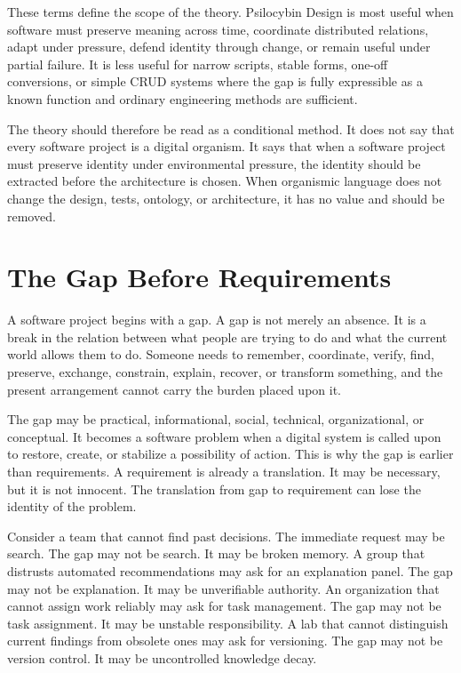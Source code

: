 \documentclass[11pt]{article}
\begin{document}
These terms define the scope of the theory. Psilocybin Design is most useful when software must preserve meaning across time, coordinate distributed relations, adapt under pressure, defend identity through change, or remain useful under partial failure. It is less useful for narrow scripts, stable forms, one-off conversions, or simple CRUD systems where the gap is fully expressible as a known function and ordinary engineering methods are sufficient.

The theory should therefore be read as a conditional method. It does not say that every software project is a digital organism. It says that when a software project must preserve identity under environmental pressure, the identity should be extracted before the architecture is chosen. When organismic language does not change the design, tests, ontology, or architecture, it has no value and should be removed.

\section{The Gap Before Requirements}

A software project begins with a gap. A gap is not merely an absence. It is a break in the relation between what people are trying to do and what the current world allows them to do. Someone needs to remember, coordinate, verify, find, preserve, exchange, constrain, explain, recover, or transform something, and the present arrangement cannot carry the burden placed upon it.

The gap may be practical, informational, social, technical, organizational, or conceptual. It becomes a software problem when a digital system is called upon to restore, create, or stabilize a possibility of action. This is why the gap is earlier than requirements. A requirement is already a translation. It may be necessary, but it is not innocent. The translation from gap to requirement can lose the identity of the problem.

Consider a team that cannot find past decisions. The immediate request may be search. The gap may not be search. It may be broken memory. A group that distrusts automated recommendations may ask for an explanation panel. The gap may not be explanation. It may be unverifiable authority. An organization that cannot assign work reliably may ask for task management. The gap may not be task assignment. It may be unstable responsibility. A lab that cannot distinguish current findings from obsolete ones may ask for versioning. The gap may not be version control. It may be uncontrolled knowledge decay.
\end{document}
